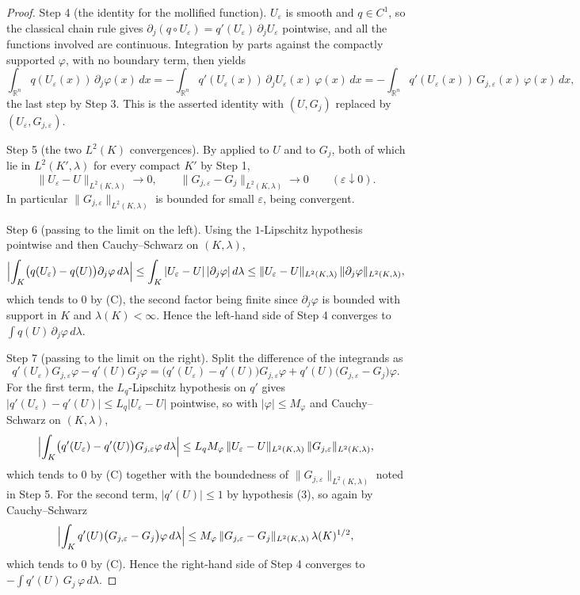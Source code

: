 \begin{proof}
Step 4 (the identity for the mollified function).  $U_\varepsilon$ is smooth and
$q \in C^1$, so the classical chain rule gives
$\partial_j (q \circ U_\varepsilon) = q'(U_\varepsilon)\,\partial_j U_\varepsilon$
pointwise, and all the functions involved are continuous.  Integration by parts
against the compactly supported $\varphi$, with no boundary term, then yields
\[
  \int_{\mathbb{R}^n} q(U_\varepsilon(x))\, \partial_j \varphi(x)\, dx
    = -\int_{\mathbb{R}^n} q'(U_\varepsilon(x))\, \partial_j U_\varepsilon(x)\,
        \varphi(x)\, dx
    = -\int_{\mathbb{R}^n} q'(U_\varepsilon(x))\, G_{j,\varepsilon}(x)\,
        \varphi(x)\, dx ,
\]
the last step by Step 3.  This is the asserted identity with
$(U, G_j)$ replaced by $(U_\varepsilon, G_{j,\varepsilon})$.

Step 5 (the two $L^2(K)$ convergences).  By  applied
to $U$ and to $G_j$, both of which lie in $L^2(K',\lambda)$ for every compact
$K'$ by Step 1,
\[
  \|U_\varepsilon - U\|_{L^2(K,\lambda)} \to 0,
  \qquad
  \|G_{j,\varepsilon} - G_j\|_{L^2(K,\lambda)} \to 0
  \qquad (\varepsilon \downarrow 0). \tag{C}
\]
In particular $\|G_{j,\varepsilon}\|_{L^2(K,\lambda)}$ is bounded for small
$\varepsilon$, being convergent.

Step 6 (passing to the limit on the left).  Using the $1$-Lipschitz hypothesis
pointwise and then Cauchy--Schwarz on $(K,\lambda)$,
\[
  \Bigl| \int_K \bigl(q(U_\varepsilon) - q(U)\bigr) \partial_j\varphi \, d\lambda \Bigr|
    \leq \int_K |U_\varepsilon - U|\, |\partial_j\varphi| \, d\lambda
    \leq \|U_\varepsilon - U\|_{L^2(K,\lambda)}\,
         \|\partial_j\varphi\|_{L^2(K,\lambda)} ,
\]
which tends to $0$ by (C), the second factor being finite since
$\partial_j\varphi$ is bounded with support in $K$ and $\lambda(K) < \infty$.
Hence the left-hand side of Step 4 converges to
$\int q(U)\,\partial_j\varphi \, d\lambda$.

Step 7 (passing to the limit on the right).  Split the difference of the
integrands as
\[
  q'(U_\varepsilon) G_{j,\varepsilon} \varphi - q'(U) G_j \varphi
    = \bigl(q'(U_\varepsilon) - q'(U)\bigr) G_{j,\varepsilon} \varphi
      + q'(U) \bigl(G_{j,\varepsilon} - G_j\bigr) \varphi .
\]
For the first term, the $L_q$-Lipschitz hypothesis on $q'$ gives
$|q'(U_\varepsilon) - q'(U)| \leq L_q |U_\varepsilon - U|$ pointwise, so with
$|\varphi| \leq M_\varphi$ and Cauchy--Schwarz on $(K,\lambda)$,
\[
  \Bigl| \int_K \bigl(q'(U_\varepsilon) - q'(U)\bigr) G_{j,\varepsilon} \varphi
    \, d\lambda \Bigr|
    \leq L_q M_\varphi \, \|U_\varepsilon - U\|_{L^2(K,\lambda)}\,
          \|G_{j,\varepsilon}\|_{L^2(K,\lambda)} ,
\]
which tends to $0$ by (C) together with the boundedness of
$\|G_{j,\varepsilon}\|_{L^2(K,\lambda)}$ noted in Step 5.  For the second term,
$|q'(U)| \leq 1$ by hypothesis (3), so again by Cauchy--Schwarz
\[
  \Bigl| \int_K q'(U) \bigl(G_{j,\varepsilon} - G_j\bigr) \varphi \, d\lambda
  \Bigr|
    \leq M_\varphi \, \|G_{j,\varepsilon} - G_j\|_{L^2(K,\lambda)}\,
          \lambda(K)^{1/2} ,
\]
which tends to $0$ by (C).  Hence the right-hand side of Step 4 converges to
$-\int q'(U)\,G_j\,\varphi \, d\lambda$.


\end{proof}
